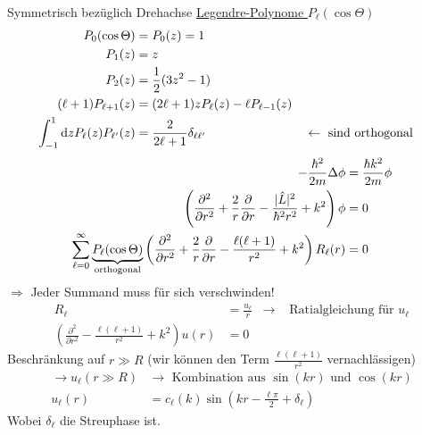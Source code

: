 Symmetrisch bezüglich Drehachse
\FloatBarrier
	\underline{Legendre-Polynome $P_\ell (\cos \Theta)$}
		\begin{align*}
			P_0 (\cos \Theta) &= P_0 (z) = 1\\
			P_1 (z) &= z \\
			P_2 (z) &= \frac{1}{2} (3z^2-1) \\
			(\ell + 1) P_{\ell + 1} (z) &= (2 \ell + 1) z P_\ell (z) - \ell P_{\ell - 1} (z) \\
			\int_{-1}^{1} \mathrm{d} z P_\ell (z) P_{\ell'} (z) &= 
			\frac{2}{2\ell + 1} \delta_{\ell \ell'} &
			&\leftarrow \text{ sind orthogonal}
		\end{align*}
		\begin{align*}
			-\frac{\hbar^2}{2m} \Delta \phi &= \frac{\hbar k^2}{2m} \phi \\
			\left( \frac{\partial^2}{\partial r^2} + \frac{2}{r} \frac{\partial}{\partial r} 
			- \frac{|\hat{L}|^2}{\hbar^2 r^2} + k^2
			\right) \phi &= 0 \\
			\sum_{\ell = 0}^{\infty} \underbrace{P_\ell (\cos \Theta)}_{\mathclap{\text{orthogonal}}}
			\left( \frac{\partial^2}{\partial r^2} + \frac{2}{r} \frac{\partial}{\partial r} 
			- \frac{\ell(\ell+1)}{r^2} + k^2
			\right) R_\ell (r) &= 0
		\end{align*}
	$\Rightarrow$ Jeder Summand muss für sich verschwinden!
		\begin{align*}
			R_\ell &= \frac{u_\ell}{r} &\rightarrow &\text{ Ratialgleichung für } u_\ell \\
			\left( \frac{\partial^2}{\partial r^2} - \frac{\ell(\ell+1)}{r^2} + k^2
			\right) u(r) &= 0
		\end{align*}
	Beschränkung auf $r\gg R$ (wir können den Term $\frac{\ell(\ell+1)}{r^2}$ vernachlässigen)
		\begin{align*}
			\rightarrow u_\ell(r \gg R) &\rightarrow \text{ Kombination aus } \sin (kr) \text{ und } \cos(kr) \\
			u_\ell(r) &= c_\ell (k) \sin \left( kr - \frac{\ell \pi}{2} + \delta_\ell \right)
		\end{align*}
	Wobei $\delta_\ell$ die Streuphase ist. 
	
